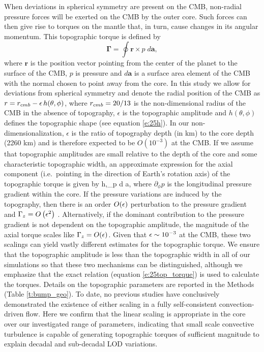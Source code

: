 When deviations in spherical symmetry are present on the CMB, non-radial pressure forces 
will be exerted on the CMB by the outer core. 
Such forces can then give rise to torques on the mantle that, in turn, cause changes in its angular momentum. \textcolor{\revtxt}{This topographic torque is defined by
\begin{equation}
	\boldsymbol{\Gamma} = \oint  \mathbf{r}\times  p\; d\mathbf{a},
	\label{e:25top_torque}
\end{equation}
where $\mathbf{r}$ is the position vector pointing from the center of the planet to the surface of the CMB, $p$ is pressure and $d\mathbf{a}$ is a surface area element of the CMB with the normal chosen to point away from the core. In this study we allow for deviations from spherical symmetry and denote the radial position of the CMB as $r = { {r_{cmb}}} -  \epsilon \, h(\theta, \phi)$, where ${ {r_{cmb}}} = 20/13$ is the non-dimensional radius of the CMB in the absence of topography, $\epsilon$ is the topographic amplitude and $h(\theta, \phi)$ defines the topographic shape (see equation \ref{e:25h}). In our non-dimensionalization, $\epsilon$ is the ratio of topography depth (in km) to the core depth (2260 km) and is therefore expected to be $O(10^{-3})$ at the CMB. 
If we assume that topographic amplitudes are small relative to the depth of the core and some characteristic topographic width, an approximate expression for the axial component (i.e.~pointing in the direction of Earth's rotation axis) of the topographic torque is given by
\be
\Gtz \approx \epsilon \oint h\lb \theta,\phi\rb \partial_\phi p \; d a, 
\label{E:torque}
\ee
where $\partial_{\phi} p$ is the longitudinal pressure gradient within the core.}
If the pressure variations are induced by the topography, then \textcolor{\revtxt}{there is an order $O(\epsilon)$ perturbation to the pressure gradient and} ${ {\Gamma_z} } = O\left ( \epsilon^{2}\right ) $\textcolor{\revtxt}{ \citep{aA77b,wK93,sG18,dJ20,mP23}}. 
Alternatively, if the dominant contribution to the pressure gradient is not dependent on the topographic amplitude, the magnitude of the axial torque scales like ${ {\Gamma_z} } = O(\epsilon)$.
Given that $\epsilon \sim 10^{-3}$ at the CMB, these two scalings can yield vastly different estimates for the topographic torque. 
\textcolor{\revtxt}{
	We ensure that the topographic amplitude is less than the topographic width in all of our simulations so that these two mechanisms can be distinguished, although we emphasize that the exact relation (equation \ref{e:25top_torque}) is used to calculate the torques. Details on the topographic parameters are reported in the Methods (Table \ref{t:bump_geo}).
}
 To date, no previous studies have conclusively demonstrated the existence of either scaling in a fully self-consistent convection-driven flow. Here we confirm that the linear scaling is appropriate in the core \textcolor{\revtxt}{over our investigated range of parameters}, indicating that small scale convective turbulence is capable of generating topographic torques of sufficient magnitude to explain \textcolor{\revtxt}{decadal and} sub-decadal LOD variations. 
 

